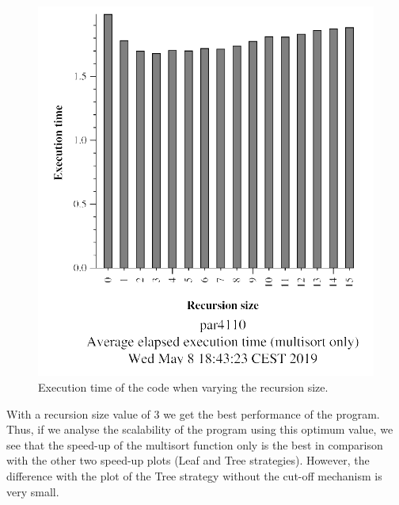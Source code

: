 \documentclass[12pt, a4paper]{article}
\begin{document}
\begin{figure}[H]
	\centering
	\includegraphics[scale=0.55]{./images/S2/multisort-omp-4-cutoff}
	
	\label{fig:multivalues_cutoff}
	\caption{Execution time of the code when varying the recursion size.}
\end{figure}

With a recursion size value of 3 we get the best performance of the program. Thus, if we analyse the scalability of the program using this optimum value, we see that the speed-up of the multisort function only is the best in comparison with the other two speed-up plots (Leaf and Tree strategies). However, the difference with the plot of the Tree strategy without the cut-off mechanism is very small.
\end{document}
